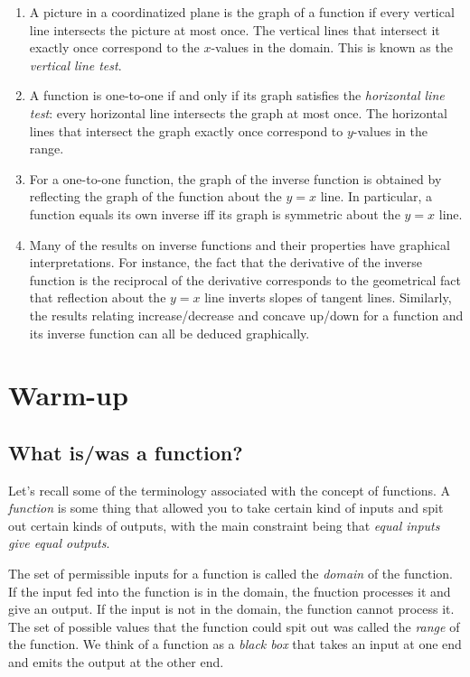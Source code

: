 \documentclass[10pt]{amsart}
\begin{document}
\begin{enumerate}
\item A picture in a coordinatized plane is the graph of a function if
  every vertical line intersects the picture at most once. The
  vertical lines that intersect it exactly once correspond to the
  $x$-values in the domain. This is known as the {\em vertical line
  test}.
\item A function is one-to-one if and only if its graph satisfies the
  {\em horizontal line test}: every horizontal line intersects the
  graph at most once. The horizontal lines that intersect the graph
  exactly once correspond to $y$-values in the range.
\item For a one-to-one function, the graph of the inverse function is
  obtained by reflecting the graph of the function about the $y = x$
  line. In particular, a function equals its own inverse iff its graph
  is symmetric about the $y = x$ line.
\item Many of the results on inverse functions and their properties
  have graphical interpretations. For instance, the fact that the
  derivative of the inverse function is the reciprocal of the
  derivative corresponds to the geometrical fact that reflection about
  the $y = x$ line inverts slopes of tangent lines. Similarly, the
  results relating increase/decrease and concave up/down for a
  function and its inverse function can all be deduced graphically.
\end{enumerate}

\section{Warm-up}

\subsection{What is/was a function?}

Let's recall some of the terminology associated with the concept of
functions. A {\em function} is some thing that allowed you to take
certain kind of inputs and spit out certain kinds of outputs, with the
main constraint being that {\em equal inputs give equal outputs}.

The set of permissible inputs for a function is called the {\em
domain} of the function. If the input fed into the function is in the
domain, the fnuction processes it and give an output. If the input
is not in the domain, the function cannot process it. The set of
possible values that the function could spit out was called the {\em
range} of the function. We think of a function as a {\em black box}
that takes an input at one end and emits the output at the other
end.
\end{document}
